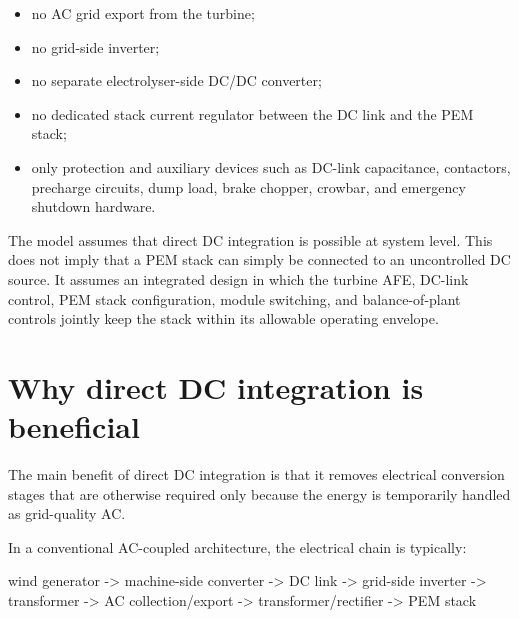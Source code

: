 \documentclass[
  letterpaper,
  DIV=11,
  numbers=noendperiod]{scrartcl}
\newenvironment{Shaded}{\begin{snugshade}}{\end{snugshade}}
\newcommand{\NormalTok}[1]{\textcolor[rgb]{0.00,0.23,0.31}{#1}}
\providecommand{\tightlist}{%
  \setlength{\itemsep}{0pt}\setlength{\parskip}{0pt}}
\begin{document}
\begin{itemize}
\tightlist
\item
  no AC grid export from the turbine;
\item
  no grid-side inverter;
\item
  no separate electrolyser-side DC/DC converter;
\item
  no dedicated stack current regulator between the DC link and the PEM
  stack;
\item
  only protection and auxiliary devices such as DC-link capacitance,
  contactors, precharge circuits, dump load, brake chopper, crowbar, and
  emergency shutdown hardware.
\end{itemize}

\begin{tcolorbox}[enhanced jigsaw, arc=.35mm, bottomrule=.15mm, bottomtitle=1mm, breakable, colback=white, colbacktitle=quarto-callout-note-color!10!white, colframe=quarto-callout-note-color-frame, coltitle=black, left=2mm, leftrule=.75mm, opacityback=0, opacitybacktitle=0.6, rightrule=.15mm, title=\textcolor{quarto-callout-note-color}{\faInfo}\hspace{0.5em}{Model assumption}, titlerule=0mm, toprule=.15mm, toptitle=1mm]

The model assumes that direct DC integration is possible at system
level. This does not imply that a PEM stack can simply be connected to
an uncontrolled DC source. It assumes an integrated design in which the
turbine AFE, DC-link control, PEM stack configuration, module switching,
and balance-of-plant controls jointly keep the stack within its
allowable operating envelope.

\end{tcolorbox}

\section{Why direct DC integration is
beneficial}\label{why-direct-dc-integration-is-beneficial}

The main benefit of direct DC integration is that it removes electrical
conversion stages that are otherwise required only because the energy is
temporarily handled as grid-quality AC.

In a conventional AC-coupled architecture, the electrical chain is
typically:

\begin{Shaded}
\begin{Highlighting}[]
\NormalTok{wind generator {-}\textgreater{} machine{-}side converter {-}\textgreater{} DC link {-}\textgreater{} grid{-}side inverter {-}\textgreater{} transformer {-}\textgreater{} AC collection/export {-}\textgreater{} transformer/rectifier {-}\textgreater{} PEM stack}
\end{Highlighting}
\end{Shaded}
\end{document}
